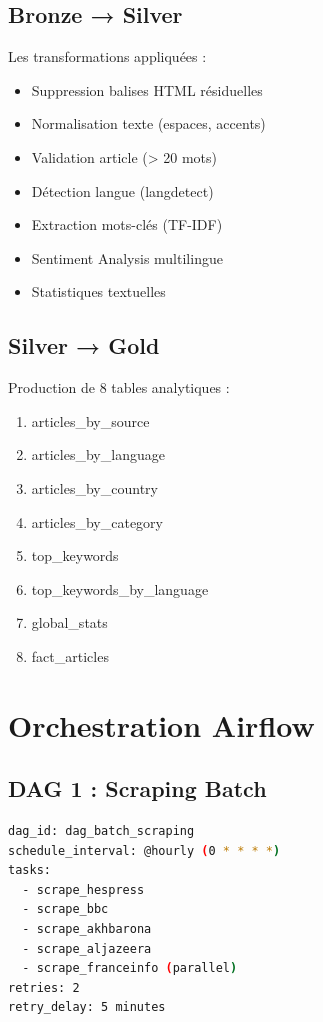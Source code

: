 \documentclass[12pt,a4paper]{report}
\begin{document}
\subsection{Bronze → Silver}

Les transformations appliquées :

\begin{itemize}
    \item Suppression balises HTML résiduelles
    \item Normalisation texte (espaces, accents)
    \item Validation article (> 20 mots)
    \item Détection langue (langdetect)
    \item Extraction mots-clés (TF-IDF)
    \item Sentiment Analysis multilingue
    \item Statistiques textuelles
\end{itemize}

\subsection{Silver → Gold}

Production de 8 tables analytiques :

\begin{enumerate}
    \item articles\_by\_source
    \item articles\_by\_language
    \item articles\_by\_country
    \item articles\_by\_category
    \item top\_keywords
    \item top\_keywords\_by\_language
    \item global\_stats
    \item fact\_articles
\end{enumerate}

\section{Orchestration Airflow}

\subsection{DAG 1 : Scraping Batch}

\begin{lstlisting}[language=bash]
dag_id: dag_batch_scraping
schedule_interval: @hourly (0 * * * *)
tasks:
  - scrape_hespress
  - scrape_bbc
  - scrape_akhbarona
  - scrape_aljazeera
  - scrape_franceinfo (parallel)
retries: 2
retry_delay: 5 minutes
\end{lstlisting}
\end{document}

